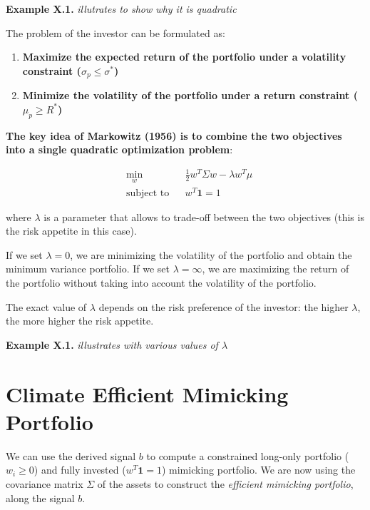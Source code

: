 \begin{examplebox}
    \textbf{Example X.1.}    
    \textit{illutrates to show why it is quadratic}
\end{examplebox}

The problem of the investor can be formulated as:

\begin{enumerate}
    \item \textbf{Maximize the expected return of the portfolio
    under a volatility constraint ($\sigma_p \leq \sigma^*$)}
    \item \textbf{Minimize the volatility of the portfolio under a
    return constraint ($\mu_p \geq R^*$)}
\end{enumerate}

\textbf{The key idea of Markowitz (1956) is to combine 
the two objectives into a single quadratic optimization problem}:

\begin{equation}
    \begin{aligned}
        & \underset{w}{\min}
        & &  \frac{1}{2} w^T \Sigma w - \lambda w^T \mu \\
        & \text{subject to}
        & & w^T \mathbf{1} = 1
    \end{aligned}
\end{equation}
    
where $\lambda$ is a parameter that allows to trade-off
between the two objectives (this is the risk appetite in this case).

If we set $\lambda = 0$, we are minimizing the volatility of the portfolio
and obtain the minimum variance portfolio.
If we set $\lambda = \infty$, we are maximizing the return of the portfolio
without taking into account the volatility of the portfolio.

The exact value of $\lambda$ depends on the risk 
preference of the investor: the higher $\lambda$, the more
higher the risk appetite.


\begin{examplebox}
    \textbf{Example X.1.}    
    \textit{illustrates with various values of $\lambda$}
\end{examplebox}

\section{Climate Efficient Mimicking Portfolio}

We can use the derived signal $b$ to compute 
a constrained long-only portfolio ($w_i \geq 0$)
and fully invested ($w^T \mathbf{1} = 1$) mimicking 
portfolio. 
We are now using the covariance matrix $\Sigma$ of the assets
to construct the \textit{efficient mimicking portfolio}, 
along the signal $b$.


